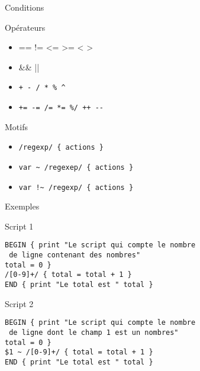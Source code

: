 \def\ftitle{Conditions}
\begin{frame}[containsverbatim]{\ftitle}
\def\blocktitle{Opérateurs}
\begin{block}{\blocktitle}
\begin{itemize}
\item == != <= >= < >
\item \&\& ||
\item \verb!+ - / * % ^!
\item \verb!+= -= /= *= %/ ++ --!
\end{itemize}
\end{block}
\def\blocktitle{Motifs}
\begin{block}{\blocktitle}
\begin{itemize}
\item \verb!/regexp/ { actions }!
\item \verb!var ~ /regexep/ { actions }!
\item \verb|var !~ /regexp/ { actions }|
\end{itemize}
\end{block}
\end{frame}


\def\ftitle{Exemples}
\begin{frame}[containsverbatim]{\ftitle}
\def\blocktitle{Script 1}
\begin{block}{\blocktitle}
\begin{verbatim}
BEGIN { print "Le script qui compte le nombre
 de ligne contenant des nombres"
total = 0 }
/[0-9]+/ { total = total + 1 }
END { print "Le total est " total }
\end{verbatim}

\end{block}
\def\blocktitle{Script 2}
\begin{block}{\blocktitle}
\begin{verbatim}
BEGIN { print "Le script qui compte le nombre
 de ligne dont le champ 1 est un nombres"
total = 0 }
$1 ~ /[0-9]+/ { total = total + 1 }
END { print "Le total est " total }
\end{verbatim}%

\end{block}
\end{frame}

